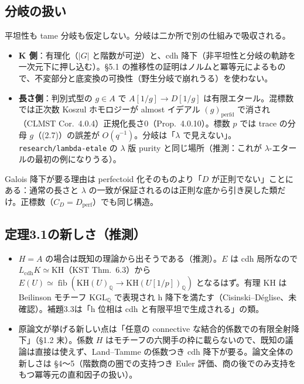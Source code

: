\documentclass[11pt,a4paper]{ltjsarticle}
\theoremstyle{plain}
\theoremstyle{definition}
\theoremstyle{remark}
\newcommand{\Q}{\mathbb{Q}}
\newcommand{\fib}{\operatorname{fib}}
\begin{document}
\subsection{分岐の扱い}
平坦性も tame 分岐も仮定しない。分岐は二か所で別の仕組みで吸収される。
\begin{itemize}
  \item \textbf{K 側}：有理化（$|G|$ と階数が可逆）と、cdh 降下（非平坦性と分岐の軌跡を一次元下に押し込む）。§5.1 の推移性の証明はノルムと冪等元によるもので、不変部分と底変換の可換性（野生分岐で崩れうる）を使わない。
  \item \textbf{長さ側}：判別式型の $g\in A$ で $A[1/g]\to D[1/g]$ は有限エタール。混標数では正次数 Koszul ホモロジーが almost イデアル $(g)_{\mathrm{perfd}}$ で消され（CLMST Cor.~4.0.4）正規化長さ0（Prop.~4.0.10）。標数 $p$ では trace の分母 $g$（(2.7)）の誤差が $O(q^{-1})$。分岐は「$\lambda$ で見えない」。\texttt{research/lambda-etale} の $\lambda$ 版 purity と同じ場所（推測：これが $\lambda$-エタールの最初の例になりうる）。
\end{itemize}
Galois 降下が要る理由は perfectoid 化そのものより「$D$ が正則でない」ことにある：通常の長さと $\lambda$ の一致が保証されるのは正則な底から引き戻した類だけ。正標数（$C_D=D_{\mathrm{perf}}$）でも同じ構造。

\subsection{定理3.1の新しさ（推測）}
\begin{itemize}
  \item $H=A$ の場合は既知の理論から出そうである（推測）。$E$ は cdh 局所なので $L_{\mathrm{cdh}}K\simeq\mathrm{KH}$（KST Thm.~6.3）から $E(U)\simeq\fib(\mathrm{KH}(U)_\Q\to\mathrm{KH}(U[1/p])_\Q)$ となるはず。有理 KH は Beilinson モチーフ $\mathrm{KGL}_\Q$ で表現され h 降下を満たす（Cisinski--Déglise、未確認）。補題3.3は「h 位相は cdh と有限平坦で生成される」の類。
  \item 原論文が挙げる新しい点は「任意の connective な結合的係数での有限全射降下」（§1.2 末）。係数 $H$ はモチーフの六関手の枠に載らないので、既知の議論は直接は使えず、Land--Tamme の係数つき cdh 降下が要る。論文全体の新しさは §4〜5（階数商の圏での支持つき Euler 評価、商の後でのみ支持をもつ冪等元の直和因子の扱い）。
\end{itemize}
\end{document}
